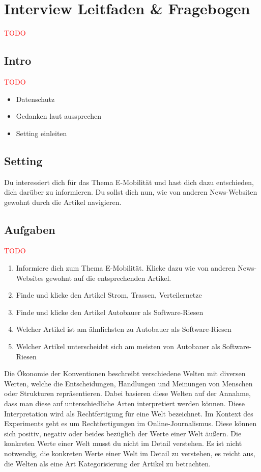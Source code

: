 \section{Interview Leitfaden \& Fragebogen}
\textcolor{red}{TODO}

\subsection{Intro}
\textcolor{red}{TODO}
\begin{itemize}
    \item Datenschutz
    \item Gedanken laut aussprechen
    \item Setting einleiten
\end{itemize}

\subsection{Setting}
Du interessiert dich für das Thema E-Mobilität und hast dich dazu entschieden, dich darüber zu informieren.
Du sollst dich nun, wie von anderen News-Websiten gewohnt durch die Artikel navigieren.

\subsection{Aufgaben}
\textcolor{red}{TODO}
\begin{enumerate}
    \item Informiere dich zum Thema E-Mobilität. Klicke dazu wie von anderen News-Websites gewohnt auf die entsprechenden Artikel.
    \item Finde und klicke den Artikel \glqq Strom, Trassen, Verteilernetze\grqq{}
    \item Finde und klicke den Artikel \glqq Autobauer als Software-Riesen\grqq{}
    \item Welcher Artikel ist am ähnlichsten zu \glqq Autobauer als Software-Riesen\grqq{}
    \item Welcher Artikel unterscheidet sich am meisten von \glqq Autobauer als Software-Riesen\grqq{}
\end{enumerate}

Die Ökonomie der Konventionen beschreibt verschiedene Welten mit diversen Werten, welche die Entscheidungen, Handlungen und Meinungen von Menschen oder Strukturen repräsentieren.
Dabei basieren diese Welten auf der Annahme, dass man diese auf unterschiedliche Arten interpretiert werden können.
Diese Interpretation wird als Rechtfertigung für eine Welt bezeichnet.
Im Kontext des Experiments geht es um Rechtfertigungen im Online-Journalismus.
Diese können sich positiv, negativ oder beides bezüglich der Werte einer Welt äußern.
Die konkreten Werte einer Welt musst du nicht im Detail verstehen.
Es ist nicht notwendig, die konkreten Werte einer Welt im Detail zu verstehen, es reicht aus, die Welten als eine Art Kategorisierung der Artikel zu betrachten.

